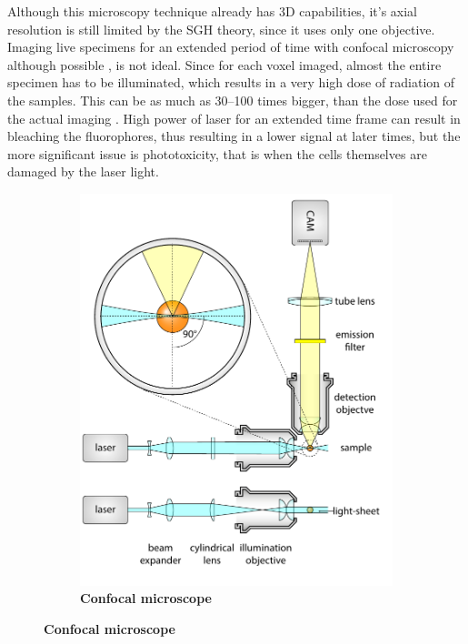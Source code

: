 \documentclass{diploma_style}
\begin{document}
Although this microscopy technique already has 3D capabilities, it's axial resolution is still limited by the SGH theory, since it uses only one objective. Imaging live specimens for an extended period of time with confocal microscopy although possible \cite{aldaz_live_2010}, is not ideal. Since for each voxel imaged, almost the entire specimen has to be illuminated, which results in a very high dose of radiation of the samples. This can be as much as 30--100 times bigger, than the dose used for the actual imaging \cite{reynaud_light_2008}. High power of laser for an extended time frame can result in bleaching the fluorophores, thus resulting in a lower signal at later times, but the more significant issue is phototoxicity, that is when the cells themselves are damaged by the laser light.

\begin{figure}
\begin{subfigure}[t]{0.49\textwidth}
	\centering
	\includegraphics[page=3,width=\textwidth]{figures/1_spim/spim_cyl}
	\caption{\textbf{Confocal microscope}}
	\label{fig:confocal}

\end{subfigure}
\end{figure}
\end{document}
